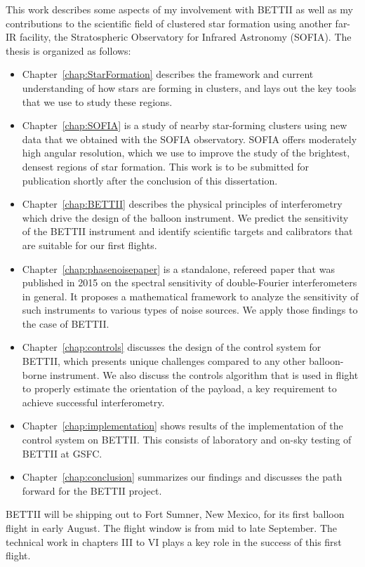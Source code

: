 This work describes some aspects of my involvement with BETTII as well as my contributions to the scientific field of clustered star formation using another far-IR facility, the Stratospheric Observatory for Infrared Astronomy (SOFIA). The thesis is organized as follows:
\begin{itemize}
\item Chapter~\ref{chap:StarFormation} describes the framework and current understanding of how stars are forming in clusters, and lays out the key tools that we use to study these regions.
\item Chapter~\ref{chap:SOFIA} is a study of nearby star-forming clusters using new data that we obtained with the SOFIA observatory. SOFIA offers moderately high angular resolution, which we use to improve the study of the brightest, densest regions of star formation. This work is to be submitted for publication shortly after the conclusion of this dissertation. 
\item Chapter~\ref{chap:BETTII} describes the physical principles of interferometry which drive the design of the balloon instrument. We predict the sensitivity of the BETTII instrument and identify scientific targets and calibrators that are suitable for our first flights.
\item Chapter~\ref{chap:phasenoisepaper} is a standalone, refereed paper that was published in 2015 on the spectral sensitivity of double-Fourier interferometers in general. It proposes a mathematical framework to analyze the sensitivity of such instruments to various types of noise sources. We apply those findings to the case of BETTII.
\item Chapter~\ref{chap:controls} discusses the design of the control system for BETTII, which presents unique challenges compared to any other balloon-borne instrument. We also discuss the controls algorithm that is used in flight to properly estimate the orientation of the payload, a key requirement to achieve successful interferometry.
\item Chapter~\ref{chap:implementation} shows results of the implementation of the control system on BETTII. This consists of laboratory and on-sky testing of BETTII at GSFC.
\item Chapter~\ref{chap:conclusion} summarizes our findings and discusses the path forward for the BETTII project.
\end{itemize}

BETTII will be shipping out to Fort Sumner, New Mexico, for its first balloon flight in early August. The flight window is from mid to late September. The technical work in chapters III to VI plays a key role in the success of this first flight.

